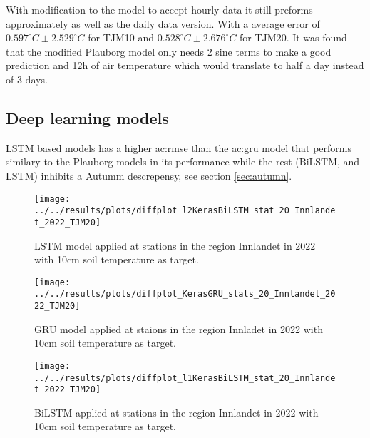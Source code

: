 With modification to the model to accept hourly data it still preforms approximately as well as the daily data version. With a average error of $0.597^\circ C \pm 2.529^\circ C$ for TJM10 and $0.528^\circ C \pm 2.676^\circ C$ for TJM20. It was found that the modified Plauborg model only needs 2 sine terms to make a good prediction and 12h of air temperature which would translate to half a day instead of 3 days.

\subsection{Deep learning models}

LSTM based models has a higher \acrshort{ac:rmse} than the \acrshort{ac:gru} model that performs similary to the Plauborg models in its performance while the rest (BiLSTM, and LSTM) inhibits a Autumm descrepensy, see section \ref{sec:autumn}. 
\begin{figure}[H]
		\centering
		\texttt{[image: ../../results/plots/diffplot\_l2KerasBiLSTM\_stat\_20\_Innlandet\_2022\_TJM20]}
		\caption[LSTM TJM10]{LSTM model applied at stations in the region Innlandet in 2022 with 10cm soil temperature as target.}
		\label{fig:diffplotl2kerasbilstmstats10innlandet2022tjm10}
\end{figure}
\begin{figure}
		\centering
		\texttt{[image: ../../results/plots/diffplot\_KerasGRU\_stats\_20\_Innlandet\_2022\_TJM20]}
		\caption[GRU TJM10]{GRU model applied at staions in the region Innladet in 2022 with 10cm soil temperature as target.}
		\label{fig:diffplotgrustats10innlandet2022tjm10}
\end{figure}
\begin{figure}
		\centering
		\texttt{[image: ../../results/plots/diffplot\_l1KerasBiLSTM\_stat\_20\_Innlandet\_2022\_TJM20]}
		\caption[BiLSTM TJM10]{BiLSTM applied at stations in the region Innlandet in 2022 with 10cm soil temperature as target.}
		\label{fig:diffplotl1kerasbilstmstats10innlandet2022tjm10}
\end{figure}

